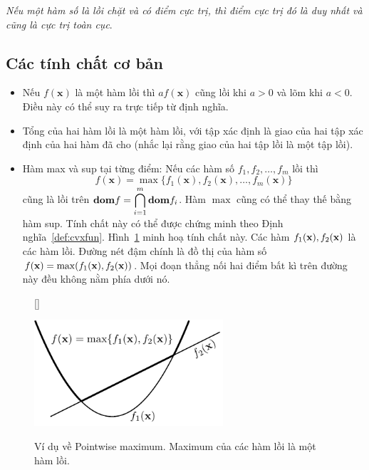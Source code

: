 \textit{Nếu một hàm số là \textit{lồi chặt} và có điểm cực trị, thì điểm cực trị đó là duy nhất và cũng là cực trị toàn cục}.


\subsection{Các tính chất cơ bản}
\label{ssub:16_properties}
\begin{itemize}
\item Nếu $f(\mathbf{x})$ là một hàm lồi thì $af(\mathbf{x})$ cũng lồi khi $a > 0$ và lõm khi $a < 0$. Điều này có
thể suy ra trực tiếp từ định nghĩa.

\item Tổng của hai {hàm lồi} là một {hàm lồi}, với tập xác
định là giao của hai tập xác định của hai hàm đã cho (nhắc lại rằng giao của
hai tập lồi là một tập lồi).
\item {Hàm max và sup tại từng điểm}: Nếu các hàm số $f_1, f_2,
\dots, f_m$ lồi thì
\begin{equation*}
f(\mathbf{x}) = \max\{f_1(\mathbf{x}), f_2(\mathbf{x}), \dots, f_m(\mathbf{x})\}
\end{equation*}
cũng là lồi trên $\displaystyle \boldsymbol{\mathbf{dom}} f = \bigcap_{i=1}^m \boldsymbol{\mathbf{dom}} f_i$. Hàm $\max$ cũng có thể thay thế bằng hàm
{sup}. Tính chất này có thể được chứng minh theo
Định nghĩa~\ref{def:cvxfun}. Hình~\ref{fig:16_max_point} minh hoạ tính chất
này. Các hàm $f_1(\mathbf{x}), f_2(\mathbf{x})$ là các hàm lồi. Đường nét đậm chính là đồ
thị của hàm số $f(\mathbf{x}) = \max(f_1(\mathbf{x}), f_2(\mathbf{x}))$. Mọi đoạn thẳng nối hai
điểm bất kì trên đường này đều {không nằm phía dưới} nó.

\end{itemize}

\begin{figure}[t]
[\FBwidth]
{\caption{Ví dụ về Pointwise maximum. Maximum của các hàm lồi là một hàm lồi.}
\label{fig:16_max_point}}
{\includegraphics[width=7cm]{Chapters/08_ConvexOptimization/16_convexity/latex/max_point.pdf}}
\end{figure}


